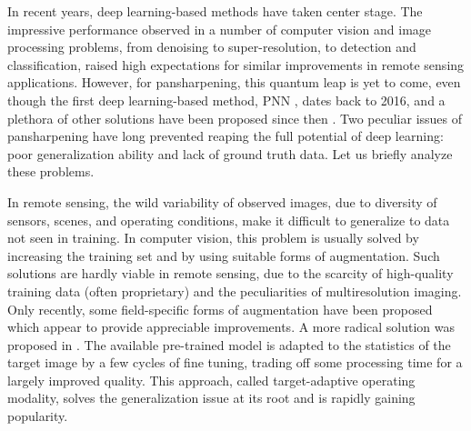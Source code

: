 \documentclass[journal]{IEEEtran}
\begin{document}
In recent years, deep learning-based methods have taken center stage.
The impressive performance observed in a number of computer vision and image processing problems,
from denoising to super-resolution, to detection and classification,
raised high expectations for similar improvements in remote sensing applications.
However, for pansharpening, this quantum leap is yet to come,
even though the first deep learning-based method, PNN \cite{Masi2016}, dates back to 2016,
and a plethora of other solutions have been proposed since then
\cite{Yang2017, Wei2017a, Wei2017L, Rao2017, Masi2017, Azarang2017, Yuan2018, Liu2018, Shao2018, Vitale2018, Zhan2019,Dong2021A,Dong2021B,Gong2022,Gong2023}.
Two peculiar issues of pansharpening have long prevented reaping the full potential of deep learning:
poor generalization ability and lack of ground truth data.
Let us briefly analyze these problems.

In remote sensing,
the wild variability of observed images, due to diversity of sensors, scenes, and operating conditions,
make it difficult to generalize to data not seen in training.
In computer vision, this problem is usually solved by increasing the training set and by using suitable forms of augmentation.
Such solutions are hardly viable in remote sensing,
due to the scarcity of high-quality training data (often proprietary) and the peculiarities of multiresolution imaging.
Only recently, some field-specific forms of augmentation have been proposed \cite{Chen2023}
which appear to provide appreciable improvements.
A more radical solution was proposed in \cite{Scarpa2018a}.
The available pre-trained model is adapted to the statistics of the target image by a few cycles of fine tuning,
trading off some processing time for a largely improved quality.
This approach, called target-adaptive operating modality, solves the generalization issue at its root
and is rapidly gaining popularity.
\end{document}
